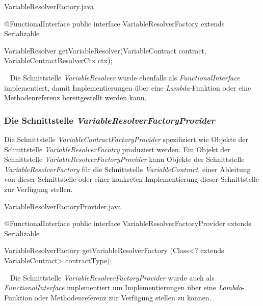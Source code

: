 \begin{program}[h]
\caption{VariableResolverFactory.java}
\label{prog:variableResolverFactory}
\begin{JavaCode}
@FunctionalInterface
public interface VariableResolverFactory extends Serializable {

  VariableResolver getVariableResolver(VariableContract contract,
                                       VariableContractResolverCtx ctx);
}
\end{JavaCode}
\end{program}
\ \newline
Die Schnittstelle \emph{VariableResolver} wurde ebenfalls als \emph{FunctionalInterface} implementiert, damit Implementierungen über eine \emph{Lambda}-Funktion oder eine Methodenreferenz bereitgestellt werden kann.

\subsubsection{Die Schnittstelle \emph{VariableResolverFactoryProvider}}
\label{sec:VariableResolverFactoryProvider}
Die Schnittstelle \emph{VariableContractFactoryProvider} spezifiziert wie Objekte der Schnittstelle \emph{VariableResolverFacotry} produziert werden. Ein Objekt der Schnittstelle \emph{VariableResolverFactoryProvider} kann Objekte der Schnittstelle \emph{VariableResolverFactory} für die Schnittstelle \emph{VariableContract}, einer Ableitung von dieser Schnittstelle oder einer konkreten Implementierung dieser Schnittstelle zur Verfügung stellen. 

\begin{program}[h]
\caption{VariableResolverFactoryProvider.java}
\label{prog:variableResolverFactoryProvider}
\begin{JavaCode}
@FunctionalInterface
public interface VariableResolverFactoryProvider extends Serializable {

    VariableResolverFactory getVariableResolverFactory
            (Class<? extends VariableContract> contractType);
}
\end{JavaCode}
\end{program}
\ \newline
Die Schnittstelle \emph{VariableResolverFactoryProvider} wurde auch als \emph{FunctionalInterface} implementiert um Implementierungen über eine \emph{Lambda}-Funktion oder Methodenreferenz zur Verfügung stellen zu können.


